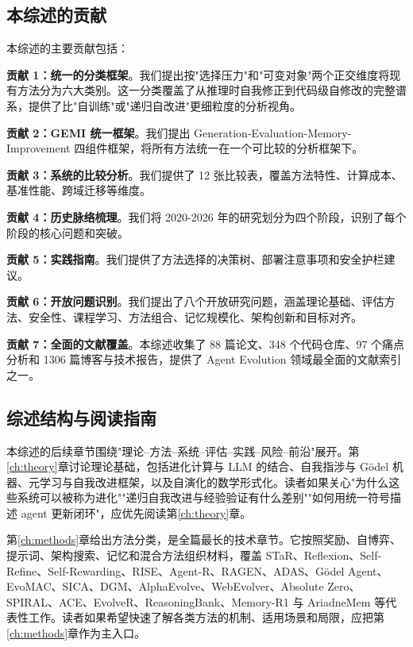 \subsection{本综述的贡献}\label{sec:intro-contributions}

本综述的主要贡献包括：

\textbf{贡献 1：统一的分类框架}。我们提出按"选择压力"和"可变对象"两个正交维度将现有方法分为六大类别。这一分类覆盖了从推理时自我修正到代码级自修改的完整谱系，提供了比"自训练"或"递归自改进"更细粒度的分析视角。

\textbf{贡献 2：GEMI 统一框架}。我们提出 Generation-Evaluation-Memory-Improvement 四组件框架，将所有方法统一在一个可比较的分析框架下。

\textbf{贡献 3：系统的比较分析}。我们提供了 12 张比较表，覆盖方法特性、计算成本、基准性能、跨域迁移等维度。

\textbf{贡献 4：历史脉络梳理}。我们将 2020-2026 年的研究划分为四个阶段，识别了每个阶段的核心问题和突破。

\textbf{贡献 5：实践指南}。我们提供了方法选择的决策树、部署注意事项和安全护栏建议。

\textbf{贡献 6：开放问题识别}。我们提出了八个开放研究问题，涵盖理论基础、评估方法、安全性、课程学习、方法组合、记忆规模化、架构创新和目标对齐。

\textbf{贡献 7：全面的文献覆盖}。本综述收集了 88 篇论文、348 个代码仓库、97 个痛点分析和 1306 篇博客与技术报告，提供了 Agent Evolution 领域最全面的文献索引之一。

\subsection{综述结构与阅读指南}\label{sec:intro-guide}

本综述的后续章节围绕"理论--方法--系统--评估--实践--风险--前沿"展开。第\ref{ch:theory}章讨论理论基础，包括进化计算与 LLM 的结合、自我指涉与 Gödel 机器、元学习与自我改进框架，以及自演化的数学形式化。读者如果关心"为什么这些系统可以被称为进化""递归自我改进与经验验证有什么差别""如何用统一符号描述 agent 更新闭环"，应优先阅读第\ref{ch:theory}章。

第\ref{ch:methods}章给出方法分类，是全篇最长的技术章节。它按照奖励、自博弈、提示词、架构搜索、记忆和混合方法组织材料，覆盖 STaR、Reflexion、Self-Refine、Self-Rewarding、RISE、Agent-R、RAGEN、ADAS、Gödel Agent、EvoMAC、SICA、DGM、AlphaEvolve、WebEvolver、Absolute Zero、SPIRAL、ACE、EvolveR、ReasoningBank、Memory-R1 与 AriadneMem 等代表性工作。读者如果希望快速了解各类方法的机制、适用场景和局限，应把第\ref{ch:methods}章作为主入口。

